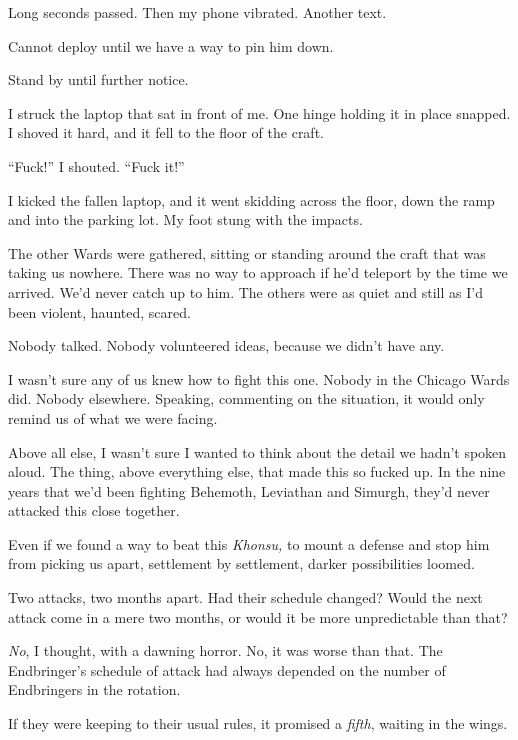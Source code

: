Long seconds passed.  Then my phone vibrated.  Another text.



Cannot deploy until we have a way to pin him down.



Stand by until further notice.



I struck the laptop that sat in front of me.  One hinge holding it in place snapped.  I shoved it hard, and it fell to the floor of the craft.



``Fuck!'' I shouted.  ``Fuck it!''



I kicked the fallen laptop, and it went skidding across the floor, down the ramp and into the parking lot.  My foot stung with the impacts.



The other Wards were gathered, sitting or standing around the craft that was taking us nowhere.  There was no way to approach if he'd teleport by the time we arrived.  We'd never catch up to him.  The others were as quiet and still as I'd been violent, haunted, scared.



Nobody talked.  Nobody volunteered ideas, because we didn't have any.



I wasn't sure any of us knew how to fight this one.  Nobody in the Chicago Wards did.  Nobody elsewhere.  Speaking, commenting on the situation, it would only remind us of what we were facing.



Above all else, I wasn't sure I wanted to think about the detail we hadn't spoken aloud.  The thing, above everything else, that made this so fucked up.  In the nine years that we'd been fighting Behemoth, Leviathan and Simurgh, they'd never attacked this close together.



Even if we found a way to beat this \emph{Khonsu, }to mount a defense and stop him from picking us apart, settlement by settlement, darker possibilities loomed.



Two attacks, two months apart.  Had their schedule changed?  Would the next attack come in a mere two months, or would it be more unpredictable than that?



\emph{No}, I thought, with a dawning horror.  No, it was worse than that.  The Endbringer's schedule of attack had always depended on the number of Endbringers in the rotation.



If they were keeping to their usual rules, it promised a \emph{fifth}, waiting in the wings.





